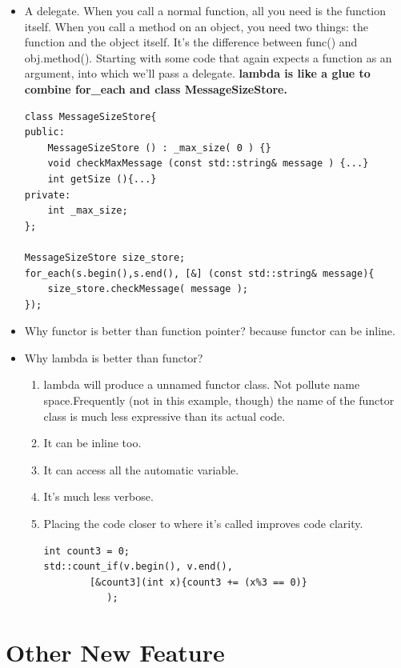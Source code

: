 \documentclass[a4paper,11pt,twoside]{book}
\begin{document}
\begin{itemize}
\item A delegate. When you call a normal function, all you need is the function itself. When you call a method on an object, you need two things: the function and the object itself. It's the difference between func() and obj.method(). Starting with some code that again expects a function as an argument, into which we'll pass a delegate. \textbf{lambda is like a glue to combine for\_each and class MessageSizeStore.}

\begin{lstlisting}[numbers=none]
class MessageSizeStore{
public:
    MessageSizeStore () : _max_size( 0 ) {}
    void checkMaxMessage (const std::string& message ) {...}
    int getSize (){...}
private:
    int _max_size;
};

MessageSizeStore size_store;
for_each(s.begin(),s.end(), [&] (const std::string& message){
	size_store.checkMessage( message );
});
\end{lstlisting}

\item Why functor is better than function pointer? because functor can be inline. 

\item Why lambda is better than functor? 
\begin{enumerate}
\item lambda will produce a unnamed functor class. Not pollute name space.Frequently (not in this example, though) the name of the functor class is much less expressive than its actual code.
\item It can be inline too.
\item It can access all the automatic variable.
\item It's much less verbose.
\item Placing the code closer to where it's called improves code clarity.
\begin{lstlisting}[numbers=none]
int count3 = 0;
std::count_if(v.begin(), v.end(), 
        [&count3](int x){count3 += (x%3 == 0)} 
           );
\end{lstlisting}
\end{enumerate}
\end{itemize}


\section{Other New Feature}
\end{document}
